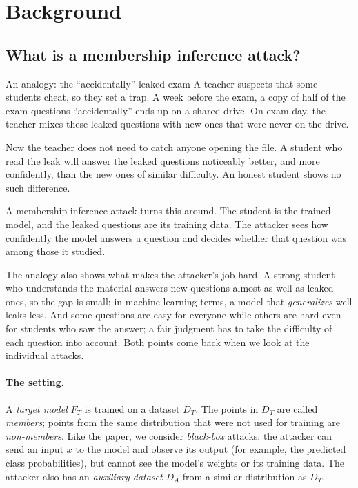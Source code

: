 \documentclass[a4paper]{article}
\begin{document}
\section{Background}
\label{sec:background}

\subsection{What is a membership inference attack?}
\label{subsec:mia}

\begin{analogybox}{An analogy: the ``accidentally'' leaked exam}
A teacher suspects that some students cheat, so they set a trap.
A week before the exam, a copy of half of the exam questions ``accidentally'' ends up on a shared drive.
On exam day, the teacher mixes these leaked questions with new ones that were never on the drive.

Now the teacher does not need to catch anyone opening the file.
A student who read the leak will answer the leaked questions noticeably better, and more confidently, than the new ones of similar difficulty.
An honest student shows no such difference.

A membership inference attack turns this around.
The student is the trained model, and the leaked questions are its training data.
The attacker sees how confidently the model answers a question and decides whether that question was among those it studied.
\end{analogybox}

The analogy also shows what makes the attacker's job hard.
A strong student who understands the material answers new questions almost as well as leaked ones, so the gap is small; in machine learning terms, a model that \emph{generalizes} well leaks less.
And some questions are easy for everyone while others are hard even for students who saw the answer; a fair judgment has to take the difficulty of each question into account.
Both points come back when we look at the individual attacks.

\paragraph{The setting.}
A \emph{target model} $F_T$ is trained on a dataset $D_T$.
The points in $D_T$ are called \emph{members}; points from the same distribution that were not used for training are \emph{non-members}.
Like the paper, we consider \emph{black-box} attacks: the attacker can send an input $x$ to the model and observe its output (for example, the predicted class probabilities), but cannot see the model's weights or its training data.
The attacker also has an \emph{auxiliary dataset} $D_A$ from a similar distribution as $D_T$.
\end{document}
